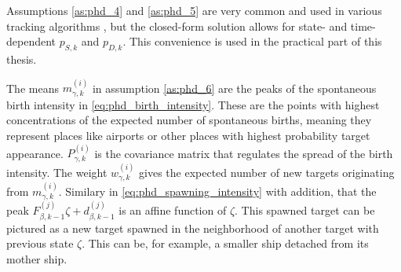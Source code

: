 Assumptions \ref{as:phd_4} and \ref{as:phd_5} are very common and used in various tracking algorithms \cite{bar1988tracking}, but the closed-form solution allows for state- and time-dependent $p_{S,k}$ and $p_{D,k}$. This convenience is used in the practical part of this thesis.

The means $m_{\gamma,k}^{(i)}$ in assumption \ref{as:phd_6} are the peaks of the spontaneous birth intensity in \eqref{eq:phd_birth_intensity}. These are the points with highest concentrations of the expected number of spontaneous births, meaning they represent places like airports or other places with highest probability target appearance. $P_{\gamma,k}^{(i)}$ is the covariance matrix that regulates the spread of the birth intensity. The weight $w_{\gamma, k}^{(i)}$ gives the expected number of new targets originating from $m_{\gamma,k}^{(i)}$. Similary in \eqref{eq:phd_spawning_intensity} with addition, that the peak $F_{\beta,k-1}^{(j)}\zeta + d_{\beta,k-1}^{(j)}$ is an affine function of $\zeta$. This spawned target can be pictured as a new target spawned in the neighborhood of another target with previous state $\zeta$. This can be, for example, a smaller ship detached from its mother ship.

